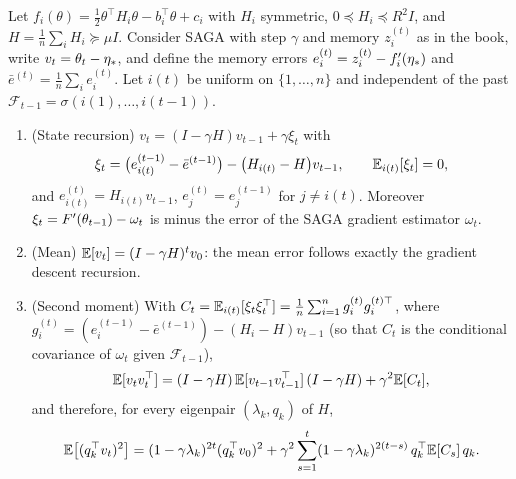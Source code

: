 \begin{lemma}\label{lem:B2-saga-quadratic}
Let $f_i(\theta)=\frac12\theta^\top H_i\theta-b_i^\top\theta+c_i$ with $H_i$ symmetric, $0\preccurlyeq H_i\preccurlyeq R^2I$,
and $H=\frac1n\sum_iH_i\succcurlyeq\mu I$. Consider SAGA with step $\gamma$ and memory $z_i^{(t)}$ as in the book, write
$v_t=\theta_t-\eta_\ast$, and define the memory errors $e_i^{(t)}=z_i^{(t)}-f'_i(\eta_\ast)$ and
$\bar e^{(t)}=\frac1n\sum_ie_i^{(t)}$. Let $i(t)$ be uniform on $\{1,\dots,n\}$ and independent of the past
$\mathcal F_{t-1}=\sigma(i(1),\dots,i(t-1))$.
\begin{enumerate}[label=(\alph*)]
\item (State recursion) $v_t=(I-\gamma H)v_{t-1}+\gamma\xi_t$ with
\[
\xi_t=\big(e^{(t-1)}_{i(t)}-\bar e^{(t-1)}\big)-\big(H_{i(t)}-H\big)v_{t-1},\qquad \mathbb{E}_{i(t)}[\xi_t]=0,
\]
and $e^{(t)}_{i(t)}=H_{i(t)}v_{t-1}$, $e^{(t)}_j=e^{(t-1)}_j$ for $j\neq i(t)$. Moreover $\xi_t=F'(\theta_{t-1})-\omega_t$
is minus the error of the SAGA gradient estimator $\omega_t$.
\item (Mean) $\mathbb{E}[v_t]=(I-\gamma H)^tv_0$: the mean error follows exactly the gradient descent recursion.
\item (Second moment) With $C_t=\mathbb{E}_{i(t)}[\xi_t\xi_t^\top]=\frac1n\sum_{i=1}^ng_i^{(t)}g_i^{(t)\top}$, where
$g_i^{(t)}=(e_i^{(t-1)}-\bar e^{(t-1)})-(H_i-H)v_{t-1}$ (so that $C_t$ is the conditional covariance of
$\omega_t$ given $\mathcal F_{t-1}$),
\[
\mathbb{E}[v_tv_t^\top]=(I-\gamma H)\,\mathbb{E}[v_{t-1}v_{t-1}^\top]\,(I-\gamma H)+\gamma^2\mathbb{E}[C_t],
\]
and therefore, for every eigenpair $(\lambda_k,q_k)$ of $H$,
\begin{equation}\label{eq:B2-saga-spectral}
\mathbb{E}\big[(q_k^\top v_t)^2\big]=(1-\gamma\lambda_k)^{2t}(q_k^\top v_0)^2+\gamma^2\sum_{s=1}^t(1-\gamma\lambda_k)^{2(t-s)}\,q_k^\top\mathbb{E}[C_s]\,q_k .
\end{equation}
\end{enumerate}
\end{lemma}

